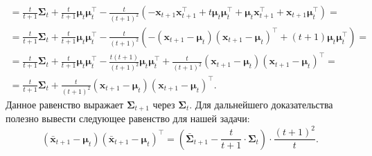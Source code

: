 \documentclass{article}
\begin{document}
\begin{enumerate}
\begin{gather*}
		= \frac{t}{t+1}\mathbf{\Sigma}_t + \frac{t}{t+1}\boldsymbol{\mu}_{t} \boldsymbol{\mu}_{t}^\intercal - \frac{t}{(t+1)^2} \left( -\mathbf{x}_{t+1} \mathbf{x}_{t+1}^\intercal + t\boldsymbol{\mu}_{t} \boldsymbol{\mu}_{t}^\intercal + \boldsymbol{\mu}_{t} \mathbf{x}_{t+1}^\intercal + \mathbf{x}_{t+1} \boldsymbol{\mu}_{t}^\intercal \right) =\\
		= \frac{t}{t+1}\mathbf{\Sigma}_t + \frac{t}{t+1}\boldsymbol{\mu}_{t} \boldsymbol{\mu}_{t}^\intercal - \frac{t}{(t+1)^2} \left( -(\mathbf{x}_{t+1}-\boldsymbol{\mu}_t)(\mathbf{x}_{t+1}-\boldsymbol{\mu}_t)^\intercal + (t+1)\boldsymbol{\mu}_{t} \boldsymbol{\mu}_{t}^\intercal \right) =\\
		= \frac{t}{t+1}\mathbf{\Sigma}_t + \frac{t}{t+1}\boldsymbol{\mu}_{t} \boldsymbol{\mu}_{t}^\intercal - \frac{t(t+1)}{(t+1)^2}\boldsymbol{\mu}_{t} \boldsymbol{\mu}_{t}^\intercal + \frac{t}{(t+1)^2}(\mathbf{x}_{t+1}-\boldsymbol{\mu}_t)(\mathbf{x}_{t+1}-\boldsymbol{\mu}_t)^\intercal =\\
		= \frac{t}{t+1}\mathbf{\Sigma}_t + \frac{t}{(t+1)^2}(\mathbf{x}_{t+1}-\boldsymbol{\mu}_t)(\mathbf{x}_{t+1}-\boldsymbol{\mu}_t)^\intercal.
	\end{gather*}
	Данное равенство выражает $\mathbf{\Sigma}_{t+1}$ через $\mathbf{\Sigma}_t$. Для дальнейшего доказательства полезно вывести следующее равенство для нашей задачи: \[(\bar{\mathbf{x}}_{t+1}-\boldsymbol{\mu}_t)(\bar{\mathbf{x}}_{t+1}-\boldsymbol{\mu}_t)^\intercal = \left(\bar{\mathbf{\Sigma}}_{t+1} - \frac{t}{t+1} \cdot \mathbf{\Sigma}_t \right) \cdot \frac{(t+1)^2}{t}.\]
	

\end{enumerate}
\end{document}
